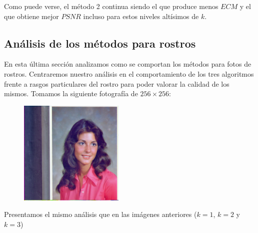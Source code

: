 Como puede verse, el método 2 continua siendo el que produce menos $ECM$ y el que obtiene mejor $PSNR$ incluso para estos niveles altísimos de $k$.

\subsection{Análisis de los métodos para rostros}


En esta última sección analizamos como se comportan los métodos para fotos de rostros. Centraremos nuestro análisis en el comportamiento de los tres algoritmos frente a rasgos particulares del rostro para poder valorar la calidad de los mismos. Tomamos la siguiente fotografía de $256\times 256$:

\begin{figure}[H]
\centering
\includegraphics[width=5cm]{fotos/rostro/orig.png}
\end{figure}

Presentamos el mismo análisis que en las imágenes anteriores ($k=1$, $k=2$ y $k=3$)

